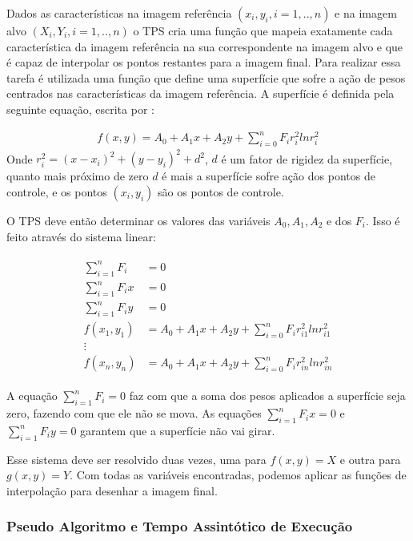     Dados as características na imagem referência $(x_i,y_i, i=1,..,n)$ e na imagem alvo $(X_i,Y_i, i=1,..,n)$
o TPS cria uma função que mapeia exatamente cada característica da imagem referência na sua
correspondente na imagem alvo e que é capaz de interpolar os pontos restantes para a imagem final. Para realizar
essa tarefa é utilizada uma função que define uma superfície que sofre a ação de pesos centrados nas
características da imagem referência. A superfície é definida pela seguinte equação, escrita por \cite{bookstein1989principal}:

\begin{align}\label{math:tps}
    f(x,y) = A_0 + A_1x + A_2y + \sum_{i=0}^n F_i r_i^2 ln r_i^2
\end{align}
Onde $r_i^2 = (x-x_i)^2 + (y-y_i)^2 + d^2$, $d$ é um fator de rigidez da superfície, quanto mais próximo de
zero $d$ é mais a superfície sofre ação dos pontos de controle, e os pontos $(x_i, y_i)$ são os pontos de controle.

    O TPS deve então determinar os valores das variáveis $A_0, A_1, A_2$ e dos $F_i$.
Isso é feito através do sistema linear:

\begin{align}
\begin{split}
    \sum_{i=1}^n F_i &= 0 \\
    \sum_{i=1}^n F_ix &= 0 \\
    \sum_{i=1}^n F_iy &= 0 \\
    f(x_1,y_1) &= A_0 + A_1x + A_2y + \sum_{i=0}^n F_i r_{i1}^2 ln r_{i1}^2 \\
    \vdots \\
    f(x_n,y_n) &= A_0 + A_1x + A_2y + \sum_{i=0}^n F_i r_{in}^2 ln r_{in}^2
\end{split}
\end{align}

A equação $\sum_{i=1}^n F_i = 0$ faz com que a soma dos pesos aplicados a superfície seja zero, fazendo com que
ele não se mova. As equações $\sum_{i=1}^n F_ix = 0$ e $\sum_{i=1}^n F_iy = 0$ garantem que a superfície não vai girar.

    Esse sistema deve ser resolvido duas vezes, uma para $f(x,y) = X$ e outra para $g(x,y) = Y$. Com todas as variáveis
encontradas, podemos aplicar as funções de interpolação para desenhar a imagem final.

\subsubsection{Pseudo Algoritmo e Tempo Assintótico de Execução}

